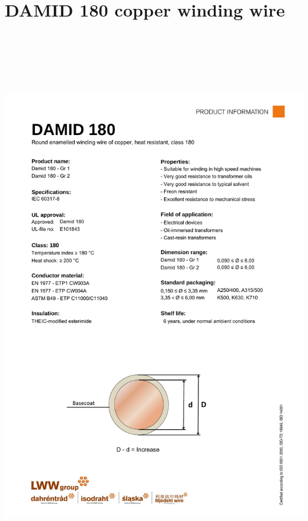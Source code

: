 \section{DAMID 180 copper winding wire}\label{appendixdamid}
\begin{center}
\includegraphics[height=690pt]{extra/DAMID-180.pdf}
\end{center}

